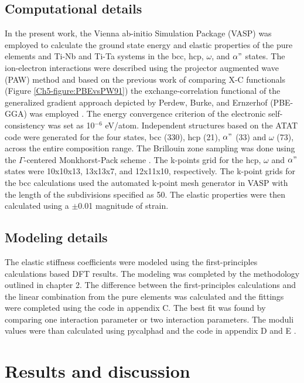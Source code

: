 \subsection{Computational details}

In the present work, the Vienna ab-initio Simulation Package (VASP) \cite{Kresse1996} was employed to calculate the ground state energy and elastic properties of the pure elements and Ti-Nb and Ti-Ta systems in the bcc, hcp, $\omega$, and $\alpha"$ states. The ion-electron interactions were described using the projector augmented wave (PAW) \cite{Kresse1999,Blochl1994} method and based on the previous work of comparing X-C functionals (Figure \ref{Ch5-figure:PBEvsPW91}) the exchange-correlation functional of the generalized gradient approach depicted by Perdew, Burke, and Ernzerhof (PBE-GGA) was employed \cite{Perdew1996a}. The energy convergence criterion of the electronic self-consistency was set as 10$^{-6}$ eV/atom. Independent structures based on the ATAT code were generated for the four states, bcc (330), hcp (21), $\alpha"$ (33) and $\omega$ (73), across the entire composition range. The Brillouin zone sampling was done using the $\Gamma$-centered Monkhorst-Pack scheme \cite{Monkhorst1976a}. The k-points grid for the hcp, $\omega$ and $\alpha"$ states were 10x10x13, 13x13x7, and 12x11x10, respectively. The k-point grids for the bcc calculations used the automated k-point mesh generator in VASP with the length of the subdivisions specified as 50. The elastic properties were then calculated using a $\pm$0.01 magnitude of strain.

\subsection{Modeling details}

The elastic stiffness coefficients were modeled using the first-principles calculations based DFT results. The modeling was completed by the methodology outlined in chapter 2. The difference between the first-principles calculations and the linear combination from the pure elements was calculated and the fittings were completed using the code in appendix C. The best fit was found by comparing one interaction parameter or two interaction parameters. The moduli values were than calculated using pycalphad and the code in appendix D and E \cite{Otis2017}.

\section{Results and discussion}

